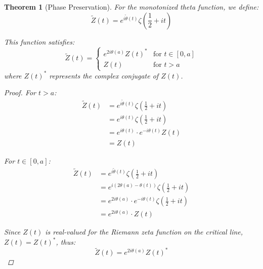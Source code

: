 \documentclass{article}
\newtheorem{theorem}{Theorem}
\theoremstyle{definition}
\begin{document}
\begin{theorem}[Phase Preservation]
For the monotonized theta function, we define:
\begin{equation}
\tilde{Z}(t) = e^{i\tilde{\theta}(t)}\zeta\left(\frac{1}{2} + it\right)
\end{equation}

This function satisfies:
\begin{equation}
\tilde{Z}(t) = 
\begin{cases}
e^{2i\theta(a)}Z(t)^* & \text{for } t \in [0,a] \\
Z(t) & \text{for } t > a
\end{cases}
\end{equation}
where $Z(t)^*$ represents the complex conjugate of $Z(t)$.

\begin{proof}
For $t > a$:
\begin{align}
\tilde{Z}(t) &= e^{i\tilde{\theta}(t)}\zeta\left(\frac{1}{2} + it\right) \\
&= e^{i\theta(t)}\zeta\left(\frac{1}{2} + it\right) \\
&= e^{i\theta(t)} \cdot e^{-i\theta(t)}Z(t) \\
&= Z(t)
\end{align}

For $t \in [0,a]$:
\begin{align}
\tilde{Z}(t) &= e^{i\tilde{\theta}(t)}\zeta\left(\frac{1}{2} + it\right) \\
&= e^{i(2\theta(a) - \theta(t))}\zeta\left(\frac{1}{2} + it\right) \\
&= e^{2i\theta(a)} \cdot e^{-i\theta(t)}\zeta\left(\frac{1}{2} + it\right) \\
&= e^{2i\theta(a)} \cdot Z(t)
\end{align}

Since $Z(t)$ is real-valued for the Riemann zeta function on the critical line, $Z(t) = Z(t)^*$, thus:
\begin{equation}
\tilde{Z}(t) = e^{2i\theta(a)}Z(t)^*
\end{equation}
\end{proof}
\end{theorem}
\end{document}
